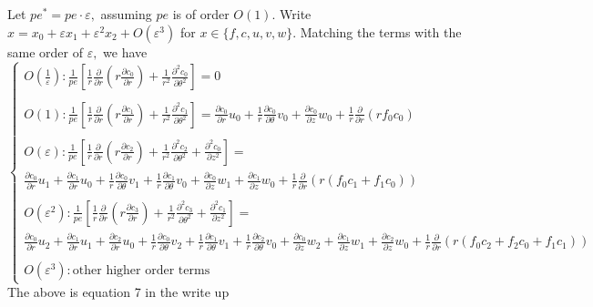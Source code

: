 \documentclass[12pt]{article}
\renewcommand{\(}{\left (}
\renewcommand{\)}{\right )}
\begin{document}
Let ${pe}^* = pe \cdot \varepsilon,$ assuming $pe$ is of order $O(1).$ Write $x = x_0 + \varepsilon x_1 + \varepsilon^2 x_2 + O(\varepsilon^3)$ for $x \in \{ f, c, u, v, w\}.$ Matching the terms with the same order of $\varepsilon,$ we have
\begin{equation}
	\begin{cases}
		O(\frac{1}{\varepsilon}): \frac{1}{pe}\left[\frac{1}{r} \frac{\partial}{\partial r}\left(r \frac{\partial c_{0}}{\partial r}\right)+ \frac{1}{r^2}\frac{\partial^2 c_0 }{\partial \theta^2}\right] = 0\\
		\\
		O(1): \frac{1}{pe}\left[\frac{1}{r} \frac{\partial}{\partial r}\left(r \frac{\partial c_{1}}{\partial r}\right)+\frac{1}{r^{2}} \frac{\partial^{2} c_{1}}{\partial \theta^{2}}\right] = \frac{\partial c_{0}}{\partial r} u_{0}+\frac{1}{r} \frac{\partial c_{0}}{\partial \theta} v_{0}+\frac{\partial c_{0}}{\partial z} w_{0}+\frac{1}{r} \frac{\partial}{\partial r}\left(r f_{0} c_{0}\right)\\
		\\
		O(\varepsilon): \frac{1}{pe} \left[\frac{1}{r} \frac{\partial}{\partial r}\left(r \frac{\partial c_{2}}{\partial r}\right)+\frac{1}{r^{2}} \frac{\partial^{2} c_{2}}{\partial \theta^{2}} + \frac{\partial^2 c_0}{\partial z^2}\right] = \\

		 \frac{\partial c_{0}}{\partial r} u_{1}+\frac{\partial c_{1}}{\partial r} u_{0}+\frac{1}{r} \frac{\partial c_{0}}{\partial \theta} v_{1}+\frac{1}{r} \frac{\partial c_{1}}{\partial \theta} v_{0} +\frac{\partial c_{0}}{\partial z} w_{1}+\frac{\partial c_{1}}{\partial z} w_{0}+\frac{1}{r} \frac{\partial}{\partial r}\left(r\left(f_{0} c_{1}+f_{1} c_{0}\right)\right)\\
		 \\

		 O(\varepsilon^2): \frac{1}{pe} \left[\frac{1}{r} \frac{\partial}{\partial r}\left(r \frac{\partial c_{3}}{\partial r}\right)+\frac{1}{r^{2}}\frac{\partial^{2} c_{3}}{\partial \theta^{2}}+\frac{\partial^{2} c_{1}}{\partial z^{2}}\right] = \\
		\frac{\partial c_{0}}{\partial r} u_{2}+\frac{\partial c_{1}}{\partial r} u_{1}+\frac{\partial c_{2}}{\partial r} u_{0}
		 +\frac{1}{r} \frac{\partial c_{0}}{\partial \theta} v_{2}+\frac{1}{r} \frac{\partial c_{1}}{\partial \theta} v_{1}+\frac{1}{r} \frac{\partial c_{2}}{\partial \theta} v_{0}+\frac{\partial c_{0}}{\partial z} w_{2}+\frac{\partial c_{1}}{\partial z} w_{1}+\frac{\partial c_{2}}{\partial z} w_{0} +\frac{1}{r} \frac{\partial}{\partial r}(r(f_0 c_2 + f_2 c_0 + f_1 c_1))\\
		 \\
		 O(\varepsilon^3): \text{other higher order terms}
		 \label{writeupeq7}
	\end{cases}
\end{equation}
The above is equation 7 in the write up
\end{document}
